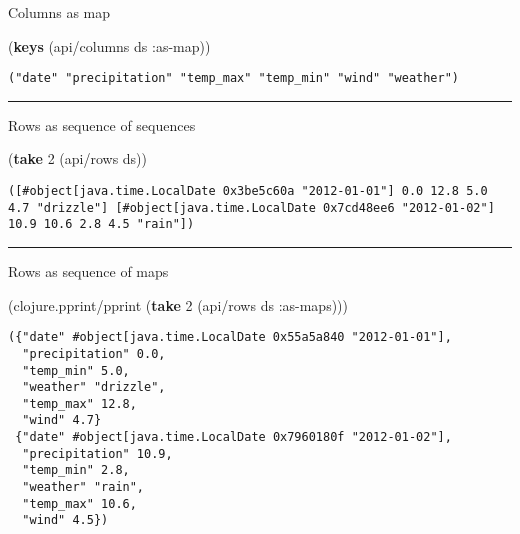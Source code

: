 \documentclass[]{article}
\newenvironment{Shaded}{\begin{snugshade}}{\end{snugshade}}
\newcommand{\AttributeTok}[1]{\textcolor[rgb]{0.77,0.63,0.00}{#1}}
\newcommand{\DecValTok}[1]{\textcolor[rgb]{0.00,0.00,0.81}{#1}}
\newcommand{\KeywordTok}[1]{\textcolor[rgb]{0.13,0.29,0.53}{\textbf{#1}}}
\newcommand{\NormalTok}[1]{#1}
\begin{document}
Columns as map

\begin{Shaded}
\begin{Highlighting}[]
\NormalTok{(}\KeywordTok{keys}\NormalTok{ (api/columns ds }\AttributeTok{:as-map}\NormalTok{))}
\end{Highlighting}
\end{Shaded}

\begin{verbatim}
("date" "precipitation" "temp_max" "temp_min" "wind" "weather")
\end{verbatim}

\begin{center}\rule{0.5\linewidth}{0.5pt}\end{center}

Rows as sequence of sequences

\begin{Shaded}
\begin{Highlighting}[]
\NormalTok{(}\KeywordTok{take} \DecValTok{2}\NormalTok{ (api/rows ds))}
\end{Highlighting}
\end{Shaded}

\begin{verbatim}
([#object[java.time.LocalDate 0x3be5c60a "2012-01-01"] 0.0 12.8 5.0 4.7 "drizzle"] [#object[java.time.LocalDate 0x7cd48ee6 "2012-01-02"] 10.9 10.6 2.8 4.5 "rain"])
\end{verbatim}

\begin{center}\rule{0.5\linewidth}{0.5pt}\end{center}

Rows as sequence of maps

\begin{Shaded}
\begin{Highlighting}[]
\NormalTok{(clojure.pprint/pprint (}\KeywordTok{take} \DecValTok{2}\NormalTok{ (api/rows ds }\AttributeTok{:as-maps}\NormalTok{)))}
\end{Highlighting}
\end{Shaded}

\begin{verbatim}
({"date" #object[java.time.LocalDate 0x55a5a840 "2012-01-01"],
  "precipitation" 0.0,
  "temp_min" 5.0,
  "weather" "drizzle",
  "temp_max" 12.8,
  "wind" 4.7}
 {"date" #object[java.time.LocalDate 0x7960180f "2012-01-02"],
  "precipitation" 10.9,
  "temp_min" 2.8,
  "weather" "rain",
  "temp_max" 10.6,
  "wind" 4.5})
\end{verbatim}
\end{document}
